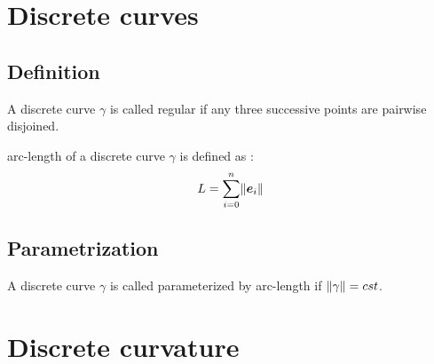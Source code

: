 \section{Discrete curves}

\cite{Hoffmann2008, Carroll2014, Crane2015}

\subsection{Definition}


A discrete curve $\gamma$ is called regular if any three successive points are pairwise disjoined.

arc-length of a discrete curve $\gamma$ is defined as :
\begin{equation}
	L = \sum_{i=0}^n \lVert\boldsymbol{e}_i\rVert
\end{equation}

\subsection{Parametrization}

A discrete curve $\gamma$ is called parameterized by arc-length if $\lVert\gamma\rVert=cst$.

\section{Discrete curvature}

